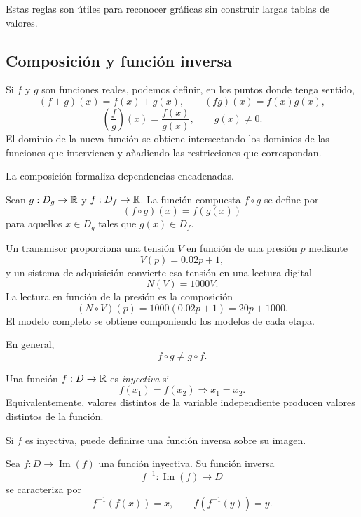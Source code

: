 Estas reglas son útiles para reconocer gráficas sin construir largas tablas de valores.

\subsection{Composición y función inversa}

Si $f$ y $g$ son funciones reales, podemos definir, en los puntos donde tenga sentido,
\[
(f+g)(x)=f(x)+g(x),\qquad
(fg)(x)=f(x)g(x),
\]
\[
\left(\frac fg\right)(x)=\frac{f(x)}{g(x)},\qquad g(x)\neq0.
\]
El dominio de la nueva función se obtiene intersectando los dominios de las funciones que intervienen y añadiendo las restricciones que correspondan.

La composición formaliza dependencias encadenadas.

\begin{definition}[Composición]
Sean $g:D_g\to\mathbb{R}$ y $f:D_f\to\mathbb{R}$. La función compuesta $f\circ g$ se define por
\[
(f\circ g)(x)=f(g(x))
\]
para aquellos $x\in D_g$ tales que $g(x)\in D_f$.
\end{definition}

\begin{example}
Un transmisor proporciona una tensión $V$ en función de una presión $p$ mediante
\[
V(p)=0.02p+1,
\]
y un sistema de adquisición convierte esa tensión en una lectura digital
\[
N(V)=1000V.
\]
La lectura en función de la presión es la composición
\[
(N\circ V)(p)=1000(0.02p+1)=20p+1000.
\]
El modelo completo se obtiene componiendo los modelos de cada etapa.
\end{example}

En general,
\[
f\circ g\neq g\circ f.
\]

\begin{definition}
Una función $f:D\to\mathbb{R}$ es \emph{inyectiva} si
\[
f(x_1)=f(x_2)\Longrightarrow x_1=x_2.
\]
Equivalentemente, valores distintos de la variable independiente producen valores distintos de la función.
\end{definition}

Si $f$ es inyectiva, puede definirse una función inversa sobre su imagen.

\begin{definition}
Sea $f:D\to\operatorname{Im}(f)$ una función inyectiva. Su función inversa
\[
f^{-1}:\operatorname{Im}(f)\to D
\]
se caracteriza por
\[
f^{-1}(f(x))=x,
\qquad
f(f^{-1}(y))=y.
\]
\end{definition}

